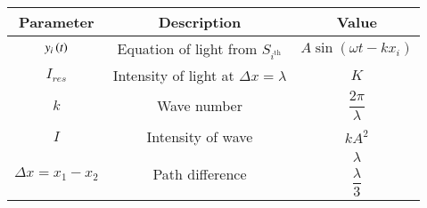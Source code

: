 \begin{tabular}{|c|c|c|}
\hline 
   \textbf{Parameter}  &\textbf{Description} &\textbf{Value} \\
\hline
$y_i\left(t\right)$ & Equation of light from $ S_{i^\text{th}}$ &  $A\sin(\omega t  - kx_i)$ \\
\hline
$I_{res}$ & Intensity of light at $\Delta x = \lambda$ &$K$ \\
\hline
$k $ & Wave number &$ \dfrac{2\pi}{\lambda}$  \\ 
\hline
$I $&  Intensity of wave  &$ kA^2$  \\
\hline
\multirow{3}{*}{$\Delta x = x_1 - x_2$} & \multirow{3}{*}{Path difference} & $\lambda$ \\
\cline {3-3}
& & $\dfrac{\lambda}{3}$ \\ 
\hline
\end{tabular}
